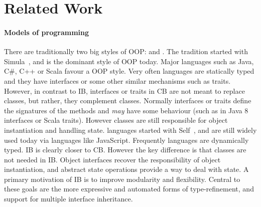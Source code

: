 \section{Related Work}\label{sec:related}



\paragraph{Models of \objectoriented programming}
There are traditionally two big styles of OOP: \classbased and
\prototypebased. The \classbased tradition started with Simula~\cite{Dahl66simula},
and is the dominant style of OOP today. Major languages such
as Java, C\#, C++ or Scala favour a \classbased OOP style. Very often
\classbased languages are statically typed and they have interfaces or
some other similar mechanisms such as traits. However, in contrast to
IB, interfaces or traits in CB are not meant to
replace classes, but rather, they complement classes. Normally
interfaces or traits define the signatures of the methods and
\emph{may} have some behaviour (such as in Java 8 interfaces or Scala
traits). However classes are still responsible for object
instantiation and handling state. \Prototypebased languages started
with Self~\cite{Ungar87self}, and are still widely used today via languages like
JavaScript. Frequently \prototypebased languages are dynamically
typed. IB is clearly closer to CB. However the
key difference is that classes are not needed in IB. Object interfaces recover the responsibility of object
instantiation, and abstract state operations provide a way to deal
with state. A primary motivation of IB is to improve
modularity and flexibility. Central to these goals are the
more expressive and automated forms of type-refinement, and support
for multiple interface inheritance.

